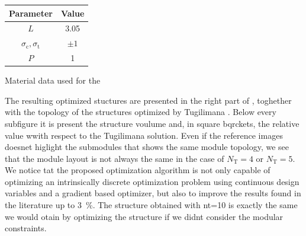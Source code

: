 \begin{margintable}
    \small
    \centering
    \begin{tabular}{cc}
    \toprule
    \textbf{Parameter}        & \textbf{Value} \\ \midrule
    $L$              & 3.05     \\
    $\sigma_\text{c}, \sigma_\text{t}$ & $\pm 1$\\
    $P$              & 1   \\
    \bottomrule
    \end{tabular}
    \caption{Material data used for the }
    \label{tab:06_modular_tug}
\end{margintable}

The resulting optimized stuctures are presented in the right part of , toghether with the topology of the structures optimized by Tugilimana \etal {}. Below every subfigure it is present the structure voulume and, in square bqrckets, the relative value wwith respect to the Tugilimana solution. Even if the reference images doesnet higlight the submodules that shows the same module topology, we see that the module layout is not always the same \eg in the case of $N_\text{T}=4$ or $N_\text{T}=5$.  We notice tat the proposed optimization algorithm is not only capable of optimizing an intrinsically discrete optimization problem using continuous design variables and a gradient based optimizer, but also to improve the results found in the literature up to \qty{3}{\percent}. The structure obtained with nt=10 is exactly the same we would otain by optimizing the structure if we didnt consider the modular constraints.


